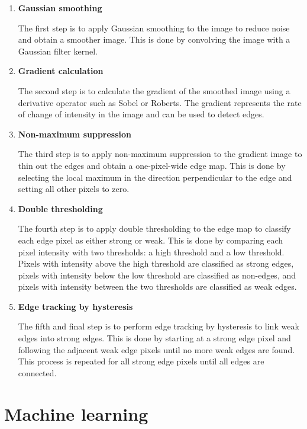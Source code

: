        \begin{enumerate}

        \item \textbf{Gaussian smoothing}

        The first step is to apply Gaussian smoothing to the image to reduce noise and obtain a smoother image. 
        This is done by convolving the image with a Gaussian filter kernel.

        \item \textbf{Gradient calculation}

        The second step is to calculate the gradient of the smoothed image using a derivative operator such as Sobel or Roberts. 
        The gradient represents the rate of change of intensity in the image and can be used to detect edges.

        \item \textbf{Non-maximum suppression}

        The third step is to apply non-maximum suppression to the gradient image to thin out the edges and obtain a one-pixel-wide edge map. 
        This is done by selecting the local maximum in the direction perpendicular to the edge and setting all other pixels to zero.

        \item \textbf{Double thresholding}

        The fourth step is to apply double thresholding to the edge map to classify each edge pixel as either strong or weak. 
        This is done by comparing each pixel intensity with two thresholds: a high threshold and a low threshold. 
        Pixels with intensity above the high threshold are classified as strong edges, pixels with intensity below the low threshold are classified as non-edges, and pixels with intensity between the two thresholds are classified as weak edges.

        \item \textbf{Edge tracking by hysteresis}

        The fifth and final step is to perform edge tracking by hysteresis to link weak edges into strong edges. 
        This is done by starting at a strong edge pixel and following the adjacent weak edge pixels until no more weak edges are found. 
        This process is repeated for all strong edge pixels until all edges are connected.

        \end{enumerate}

\section{Machine learning}

